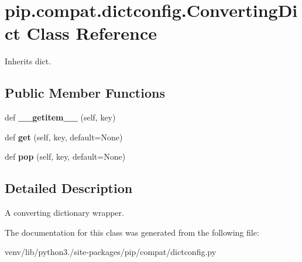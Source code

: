 \hypertarget{classpip_1_1compat_1_1dictconfig_1_1_converting_dict}{}\section{pip.\+compat.\+dictconfig.\+Converting\+Dict Class Reference}
\label{classpip_1_1compat_1_1dictconfig_1_1_converting_dict}


Inherits dict.

\subsection*{Public Member Functions}
\begin{DoxyCompactItemize}
\item 
\mbox{\label{classpip_1_1compat_1_1dictconfig_1_1_converting_dict_a58fe41a1100bda23882b5c653e507f57}} 
def {\bfseries \+\_\+\+\_\+getitem\+\_\+\+\_\+} (self, key)
\item 
\mbox{\label{classpip_1_1compat_1_1dictconfig_1_1_converting_dict_a6018e50eecd654751179e8ae61bf7822}} 
def {\bfseries get} (self, key, default=None)
\item 
\mbox{\label{classpip_1_1compat_1_1dictconfig_1_1_converting_dict_a4e40ca602ccb73aedb8f218242436e38}} 
def {\bfseries pop} (self, key, default=None)
\end{DoxyCompactItemize}


\subsection{Detailed Description}
\begin{DoxyVerb}A converting dictionary wrapper.\end{DoxyVerb}
 

The documentation for this class was generated from the following file\+:\begin{DoxyCompactItemize}
\item 
venv/lib/python3./site-\/packages/pip/compat/dictconfig.\+py\end{DoxyCompactItemize}
